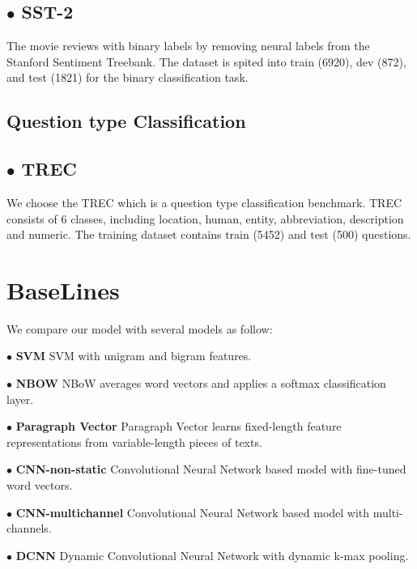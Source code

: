 \documentclass[senior]{IPSstyle}
\begin{document}
\subsection*{$\bullet$ SST-2}

The movie reviews with binary labels by removing neural labels from the Stanford Sentiment Treebank. The dataset is spited into train (6920), dev (872), and test (1821) for the binary classification task.

\subsection{Question type Classification}
\subsection*{$\bullet$ TREC}

We choose the TREC\cite{li2002learning} which is a question type classification benchmark. TREC consists of 6 classes, including location, human, entity, abbreviation, description and numeric. The training dataset contains train (5452) and test (500) questions.






\section{BaseLines}

We compare our model with several models as follow:

$\bullet$ \textbf{SVM} SVM with unigram and bigram features.

$\bullet$ \textbf{NBOW} NBoW averages word vectors and applies a softmax classification layer.

$\bullet$ \textbf{Paragraph Vector} Paragraph Vector learns fixed-length feature representations from variable-length pieces of texts.

$\bullet$ \textbf{CNN-non-static} Convolutional Neural Network based model with fine-tuned word vectors\cite{kim2014convolutional}.

$\bullet$ \textbf{CNN-multichannel} Convolutional Neural Network based model with multi-channels\cite{kim2014convolutional}.

$\bullet$ \textbf{DCNN} Dynamic Convolutional Neural Network with dynamic k-max pooling\cite{kalchbrenner2014convolutional}.
\end{document}
